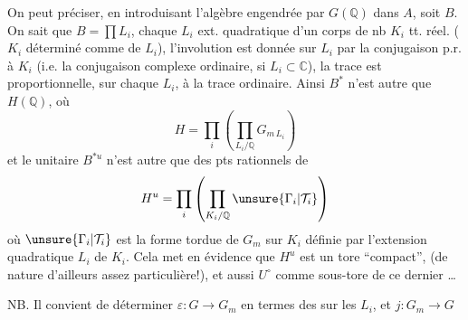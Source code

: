 
On peut préciser, en introduisant l'algèbre engendrée par
 $G(\mathbb Q)$ dans $A$, soit $B$.
On sait que $B=\prod L_i$, chaque $L_i$ ext. quadratique d'un corps
de nb $K_i$ tt. réel.
($K_i$ déterminé 
comme  de $L_i$),
l'involution est donnée sur $L_i$ par la conjugaison p.r. à $K_i$
(i.e. la conjugaison complexe ordinaire, si $L_i\subset\mathbb C$),
la trace est proportionnelle, sur chaque $L_i$, à la trace ordinaire.
Ainsi $B^*$ n'est autre que $H(\mathbb Q)$, où
\[
H=\prod_i\left(\prod_{L_i/\mathbb Q}G_{m\,L_i}\right)
\]
et le  unitaire $B^{*u}$ n'est autre que   des pts rationnels de
\[
H^u=\prod_i\left(\prod_{K_i/\mathbb Q}\unsure{\Gamma_i|\mathcal T_i}\right)
\]
où $\unsure{\Gamma_i|\mathcal T_i}$ est la forme tordue de $G_m$ sur $K_i$
définie par l'extension quadratique $L_i$ de $K_i$.
\deleted{[}
Cela met en évidence que $H^u$ est un tore ``compact'',
(de nature d'ailleurs assez particulière!), et aussi $U^\circ$ comme
sous-tore de ce dernier \ldots

NB. Il convient de déterminer $\varepsilon:G\longrightarrow G_m$
en termes des  sur les $L_i$, et
$j:G_m\longrightarrow G$ 
